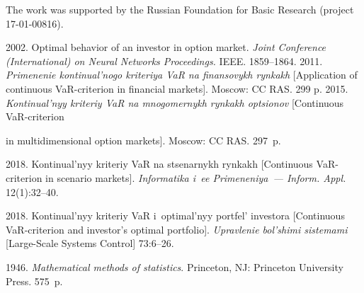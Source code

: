 
 \Ack
 \noindent
 The work was supported by the Russian Foundation for Basic 
Research (project 17-01-00816).
 


\vspace*{6pt}

  \begin{multicols}{2}

\renewcommand{\bibname}{\protect\rmfamily References}

{\small\frenchspacing
 {%
 \begin{thebibliography}{9}
 
 \vspace*{-18pt}
 
   2002. Optimal behavior of an investor in option market. 
\textit{Joint Conference (International) on Neural Networks Proceedings.}
 IEEE. 1859--1864. 
   2011. \textit{Primenenie kontinual'nogo kriteriya VaR 
na finansovykh rynkakh} [Application of continuous VaR-criterion in financial 
markets]. Moscow: CC RAS. 299 p. 
   2015. \textit{Kontinual'nyy kriteriy VaR na 
mnogomernykh rynkakh optsionov} [Continuous VaR-criterion\linebreak\vspace*{-12pt}

\columnbreak

\noindent
 in multidimensional 
option markets]. Moscow: CC RAS. 297~p. 

\vspace*{-2.5pt}

   2018. Kontinual'nyy kriteriy VaR na stsenarnykh 
rynkakh [Continuous VaR-criterion in scenario markets]. \textit{Informatika i~ee 
Primeneniya~--- Inform. Appl.} 12(1):32--40. 

\vspace*{-2.5pt}

   2018. Kontinual'nyy kriteriy VaR i~optimal'nyy 
portfel' investora [Continuous VaR-criterion and  investor's 
optimal portfolio]. 
\textit{Upravlenie bol'shimi sistemami} [Large-Scale Systems Control] 73:6--26. 

\vspace*{-2.5pt}

   1946. \textit{Mathematical methods of statistics}. Princeton, 
NJ: Princeton University Press. 575~p.
 \end{thebibliography}

 }
 }

\end{multicols}

